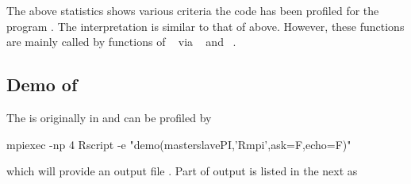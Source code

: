 The above statistics shows various criteria the code has been profiled for the
program . The interpretation is similar to that of
 above. However, these  functions are
mainly called by functions of ~\citep{slug}
via ~\citep{Schmidt2012pbdBASEpackage}
and ~\citep{Chen2012pbdSLAPpackage}.




\subsection{Demo of }

The  is originally in  and can be
profiled by
\begin{Code}
mpiexec -np 4 Rscript -e "demo(masterslavePI,'Rmpi',ask=F,echo=F)"
\end{Code}
which will provide an output file .
Part of output is listed in the next as
